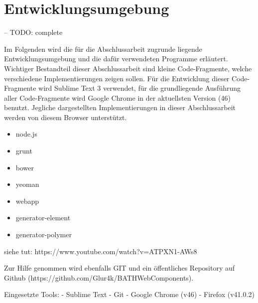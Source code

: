 \section{Entwicklungsumgebung}\label{entwicklungsumgebung}

-- TODO: complete

Im Folgenden wird die für die Abschlussarbeit zugrunde liegende
Entwicklungsumgebung und die dafür verwendeten Programme erläutert.
Wichtiger Bestandteil dieser Abschlussarbeit sind kleine Code-Fragmente,
welche verschiedene Implementierungen zeigen sollen. Für die Entwicklung
dieser Code-Fragmente wird Sublime Text 3 verwendet, für die
grundliegende Ausführung aller Code-Fragmente wird Google Chrome in der
aktuellsten Version (46) benutzt. Jegliche dargestellten
Implementierungen in dieser Abschlussarbeit werden von diesem Browser
unterstützt.

\begin{itemize}
\tightlist
\item
  node.js
\item
  grunt
\item
  bower
\item
  yeoman
\item
  webapp
\item
  generator-element
\item
  generator-polymer
\end{itemize}

siehe tut: https://www.youtube.com/watch?v=ATPXN1-AWs8

Zur Hilfe genommen wird ebenfalls GIT und ein öffentliches Repository
auf Github (https://github.com/Glur4k/BATHWebComponents).

Eingesetzte Tools: - Sublime Text - Git - Google Chrome (v46) - Firefox
(v41.0.2)
